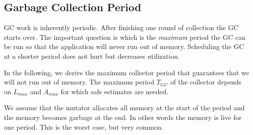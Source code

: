 \subsection{Garbage Collection Period}

GC work is inherently periodic. After finishing one round of
collection the GC starts over. The important question is which is
the \emph{maximum} period the GC can be run so that the application
will never run out of memory. Scheduling the GC at a shorter period
does not hurt but decreases utilization.

In the following, we derive the maximum collector period that
guarantees that we will not run out of memory. The maximum period
$T_{GC}$ of the collector depends on $L_{max}$ and $A_{max}$ for
which safe estimates are needed.

We assume that the mutator allocates all memory at the start of the
period and the memory becomes garbage at the end. In other words the
memory is live for one period. This is the worst case, but very
common.

